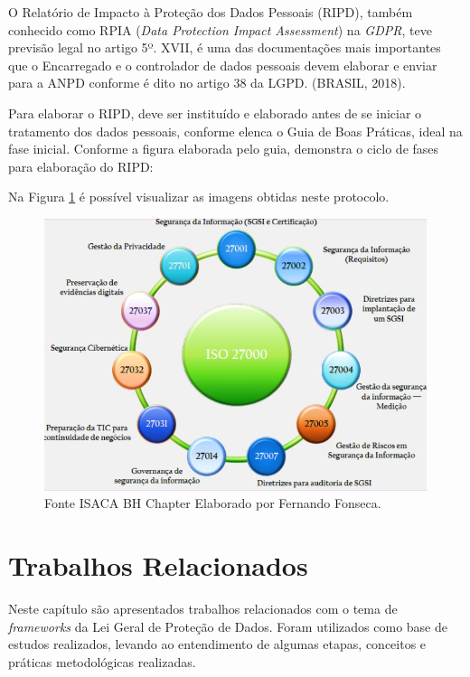 \documentclass[
	12pt,				%
	openright,			%
	oneside,			%
	a4paper,			%
	english,			%
	french,				%
	spanish,			%
	brazil,				%
	]{abntex2}
\begin{document}
O Relatório de Impacto à Proteção dos Dados Pessoais (RIPD), também conhecido como RPIA (\textit{Data Protection Impact Assessment}) na \textit{GDPR}, teve previsão legal no artigo 5º. XVII, é uma das documentações mais importantes que o Encarregado e o controlador de dados pessoais devem elaborar e enviar para a ANPD conforme é dito no artigo 38 da LGPD. (BRASIL, 2018).

Para elaborar o RIPD, deve ser instituído e elaborado antes de se iniciar o tratamento dos dados pessoais, conforme elenca o Guia de Boas Práticas, ideal na fase inicial. Conforme a figura elaborada pelo guia, demonstra o ciclo de fases para elaboração do RIPD:

Na Figura \ref{fig: Iso } é possível visualizar as imagens obtidas neste protocolo.
\begin{figure}[ht]
    \centering
    \includegraphics[width=6.0in]{Images/03ISO.jpeg}
    \caption{Fonte ISACA BH Chapter Elaborado por Fernando Fonseca.}
    \label{fig: Iso }
\end{figure}



\chapter{Trabalhos Relacionados}
\label{ch: trabalhos relacionados}

Neste capítulo são apresentados trabalhos relacionados com o tema de \textit{frameworks} da Lei Geral de Proteção de Dados. Foram utilizados como base de estudos realizados, levando ao entendimento de algumas etapas, conceitos e práticas metodológicas realizadas.
\end{document}
